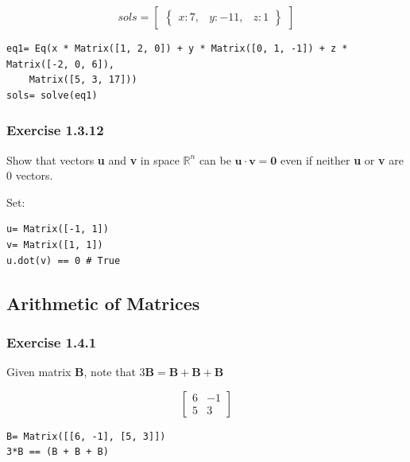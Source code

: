 \begin{equation}\label{eq:}
sols= \begin{bmatrix}\begin{Bmatrix}x : 7, & y : -11, & z : 1\end{Bmatrix}\end{bmatrix}
\end{equation}

\begin{verbatim}
eq1= Eq(x * Matrix([1, 2, 0]) + y * Matrix([0, 1, -1]) + z * Matrix([-2, 0, 6]),
    Matrix([5, 3, 17]))
sols= solve(eq1)
\end{verbatim}

\subsubsection{Exercise 1.3.12}

Show that vectors \textbf{u} and \textbf{v} in space $\mathbb{R}^n$ can be
$\mathbf{u} \cdot{} \mathbf{v} = \mathbf{0}$ even if neither \textbf{u} or \textbf{v}
are 0 vectors.

Set:

\begin{verbatim}
u= Matrix([-1, 1])
v= Matrix([1, 1])
u.dot(v) == 0 # True
\end{verbatim}

\subsection{Arithmetic of Matrices}

\subsubsection{Exercise 1.4.1}

Given matrix \textbf{B}, note that $3\mathbf{B} = \mathbf{B} + \mathbf{B} + \mathbf{B}$

\begin{equation}
\left[\begin{matrix}6 & -1\\5 & 3\end{matrix}\right]
\end{equation}

\begin{verbatim}
B= Matrix([[6, -1], [5, 3]])
3*B == (B + B + B)
\end{verbatim}

